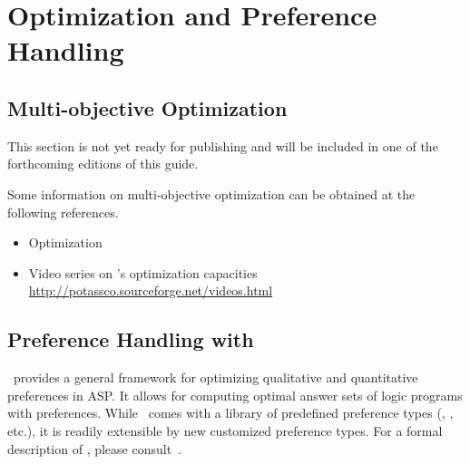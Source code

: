 
\section{Optimization and Preference Handling}
\label{sec:prefopt}

\subsection{Multi-objective Optimization}
\label{sec:oprimization}

This section is not yet ready for publishing
and will be included in one of the forthcoming editions of this guide.

Some information on multi-objective optimization
can be obtained at the following references.

\begin{itemize}
\item Optimization \cite{gekakasc11b,gekakasc11c,gekasc11b,ankamasc12a}
\item Video series on \clasp's optimization capacities \url{http://potassco.sourceforge.net/videos.html}
\end{itemize}

\subsection{Preference Handling with \asprin}\label{sec:asprin}
%
%
\asprin\ provides a general framework for optimizing qualitative and quantitative preferences in ASP.
It allows for computing optimal answer sets of logic programs with preferences.
While \asprin\ comes with a library of predefined preference types 
(, , etc.),
it is readily extensible by new customized preference types.
For a formal description of \asprin, please consult~\cite{brderosc15a}. 


